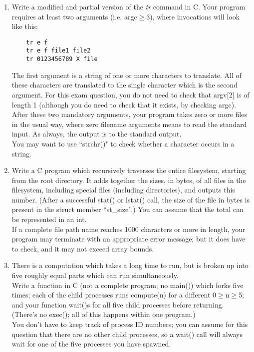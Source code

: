 \documentclass[11pt]{article}
\begin{document}
\begin{enumerate}
	\newpage
	\item Write a modified and partial version of the \textit{tr} command in C. Your program requires at least two arguments (i.e. argc$ \geq $3), where invocations will look like this:\begin{Verbatim}
	tr e f
	tr e f file1 file2
	tr 0123456789 X file
	\end{Verbatim}
	The first argument is a string of one or more characters to translate. All of these characters are translated to the single character which is the second argument. For this exam question, you do not need to check that argv[2] is of length 1 (although you do need to check that it exists, by checking argc).\\
	\hspace*{1cm} After these two mandatory arguments, your program takes zero or more files in the usual way, where zero filename arguments means to read the standard input. As always, the output is to the standard output.\\
	\hspace*{1cm} You may want to use ``strchr()" to check whether a character occurs in a string.
		
		
	\newpage
	\item Write a C program which recursively traverses the entire filesystem, starting from the root directory. It adds together the sizes, in bytes, of all files in the filesystem, including special files (including directories), and outputs this number. (After a successful stat() or lstat() call, the size of the file in bytes is present in the struct member 	``st\_size".) You can assume that the total can be represented in an int.\\
	\hspace*{1cm}If a complete file path name reaches 1000 characters or more in length, your program may terminate with an appropriate error message; but it does have to check, and it may not exceed array bounds.
		
		
	\newpage
	\item There is a computation which takes a long time to run, but is broken up into five roughly equal parts which can run simultaneously.\\
	\hspace*{1cm}Write a function in C (not a complete program; no main()) which forks five times; each of the child processes runs compute(n) for a different 0$ \geq $n$ \geq $5; and your function wait()s for all five child processes before returning.\\
	\hspace*{1cm}(There's no exec(); all of this happens within one program.)\\
	\hspace*{1cm}You don't have to keep track of process ID numbers; you can assume for this question that there are no other child processes, so a wait() call will always wait for one of the five processes you have spawned.
		
		

\end{enumerate}
\end{document}

